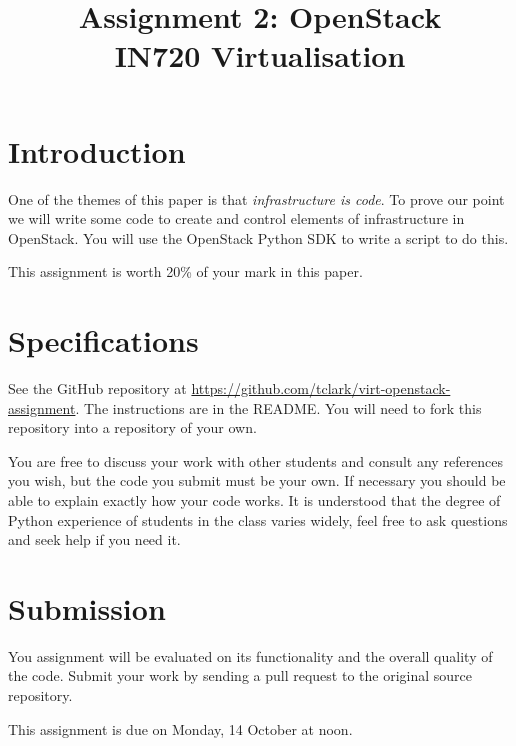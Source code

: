 \documentclass{article}
\begin{document}
\title{Assignment 2: OpenStack \\ IN720 Virtualisation}
\date{}
\maketitle

\section*{Introduction}
One of the themes of this paper is that \emph{infrastructure is code}. To prove our point we will write some code to create and control elements of infrastructure in OpenStack. You will use the OpenStack Python SDK to write a script to do this.

This assignment is worth 20\% of your mark in this paper.

\section{Specifications}
See the GitHub repository at \url{https://github.com/tclark/virt-openstack-assignment}. The instructions are in the README. You will need to fork this repository into a repository of your own.

You are free to discuss your work with other students and consult any references you wish, but the code you submit must be your own. If necessary you should be able to explain exactly how your code works. It is understood that the degree of Python experience of students in the class varies widely, feel free to ask questions and seek help if you need it.

\section{Submission}
You assignment will be evaluated on its functionality and the overall quality of the code. Submit your work by sending a pull request to the original source repository.

This assignment is due on Monday, 14 October at noon.  
\end{document}
